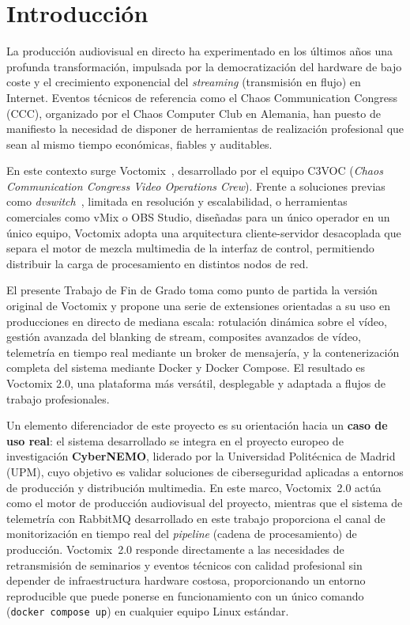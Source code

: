 \section{Introducción}

La producción audiovisual en directo ha experimentado en los últimos años una profunda
transformación, impulsada por la democratización del hardware de bajo coste y el
crecimiento exponencial del \textit{streaming} (transmisión en flujo) en Internet. Eventos técnicos de referencia como
el Chaos Communication Congress (CCC), organizado por el Chaos Computer Club en Alemania,
han puesto de manifiesto la necesidad de disponer de herramientas de realización
profesional que sean al mismo tiempo económicas, fiables y auditables.

En este contexto surge Voctomix~\cite{voctomix_github,delRio2025ugc}, desarrollado por el equipo C3VOC (\textit{Chaos Communication
Congress Video Operations Crew}). Frente a soluciones previas como \textit{dvswitch}~\cite{dvswitch_project}, limitada
en resolución y escalabilidad, o herramientas comerciales como vMix o OBS Studio,
diseñadas para un único operador en un único equipo, Voctomix adopta una arquitectura
cliente-servidor desacoplada que separa el motor de mezcla multimedia de la interfaz
de control, permitiendo distribuir la carga de procesamiento en distintos nodos de red.

El presente Trabajo de Fin de Grado toma como punto de partida la versión original
de Voctomix y propone una serie de extensiones orientadas a su uso en producciones
en directo de mediana escala: rotulación dinámica sobre el vídeo, gestión avanzada
del blanking de stream, composites avanzados de vídeo, telemetría en tiempo real
mediante un broker de mensajería, y la contenerización completa del sistema mediante
Docker y Docker Compose. El resultado es Voctomix 2.0, una plataforma más versátil,
desplegable y adaptada a flujos de trabajo profesionales.

Un elemento diferenciador de este proyecto es su orientación hacia un \textbf{caso de uso
real}: el sistema desarrollado se integra en el proyecto europeo de investigación
\textbf{CyberNEMO}, liderado por la Universidad Politécnica de Madrid (UPM), cuyo
objetivo es validar soluciones de ciberseguridad aplicadas a entornos de producción y
distribución multimedia. En este marco, Voctomix~2.0 actúa como el motor de producción
audiovisual del proyecto, mientras que el sistema de telemetría con RabbitMQ
desarrollado en este trabajo proporciona el canal de monitorización en tiempo real del
\textit{pipeline} (cadena de procesamiento) de producción. Voctomix~2.0 responde directamente a las necesidades de
retransmisión de seminarios y eventos técnicos con calidad profesional sin depender de
infraestructura hardware costosa, proporcionando un entorno reproducible que puede
ponerse en funcionamiento con un único comando (\texttt{docker compose up}) en
cualquier equipo Linux estándar.

